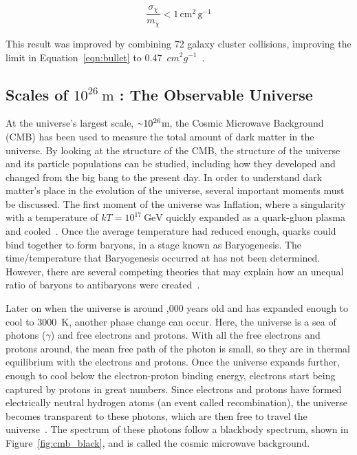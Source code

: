     \begin{equation}\label{eqn:bullet}
      \frac{\sigma_{\chi}}{m_{\chi}} < 1 \, \textrm{cm}^2 \, \textrm{g}^{-1}
    \end{equation}
    
    This result was improved by combining 72 galaxy cluster collisions, improving the limit in Equation~\ref{eqn:bullet} to \SI{0.47}{$cm^{2} g^{-1}$}~\cite{cluster_72}.


  \subsection{Scales of $10^{26}\:\text{m}$ : The Observable Universe}\label{dm_universe}
    At the universe's largest scale, $\nicetilde 10^{26}$m, the Cosmic Microwave Background (CMB) has been used to measure the total amount of dark matter in the universe.
    By looking at the structure of the CMB, the structure of the universe and its particle populations can be studied, including how they developed and changed from the big bang to the present day.
    In order to understand dark matter's place in the evolution of the universe, several important moments must be discussed.
    The first moment of the universe was Inflation, where a singularity with a temperature of $kT=10^{17}\:\textrm{GeV}$ quickly expanded as a quark-gluon plasma and cooled~\cite{inflation0,inflation1,inflation2,inflation3}.
    Once the average temperature had reduced enough, quarks could bind together to form baryons, in a stage known as Baryogenesis.
    The time/temperature that Baryogenesis occurred at has not been determined.
    However, there are several competing theories that may explain how an unequal ratio of baryons to antibaryons were created~\cite{baryogenesis1,baryogenesis2}.
    
    Later on when the universe is around ,000 years old and has expanded enough to cool to \nicetilde\SI{3000}{K}, another phase change can occur.
    Here, the universe is a sea of photons ($\gamma$) and free electrons and protons.
    With all the free electrons and protons around, the mean free path of the photon is small, so they are in thermal equilibrium with the electrons and protons.
    Once the universe expands further, enough to cool below the electron-proton binding energy, electrons start being captured by protons in great numbers.
    Since electrons and protons have formed electrically neutral hydrogen atoms (an event called recombination), the universe becomes transparent to these photons, which are then free to travel the universe~\cite{planck2015,theEarlyUniverse,CMBFundamentals,CMBFlat}.
    The spectrum of these photons follow a blackbody spectrum, shown in Figure~\ref{fig:cmb_black}, and is called the cosmic microwave background.
    
